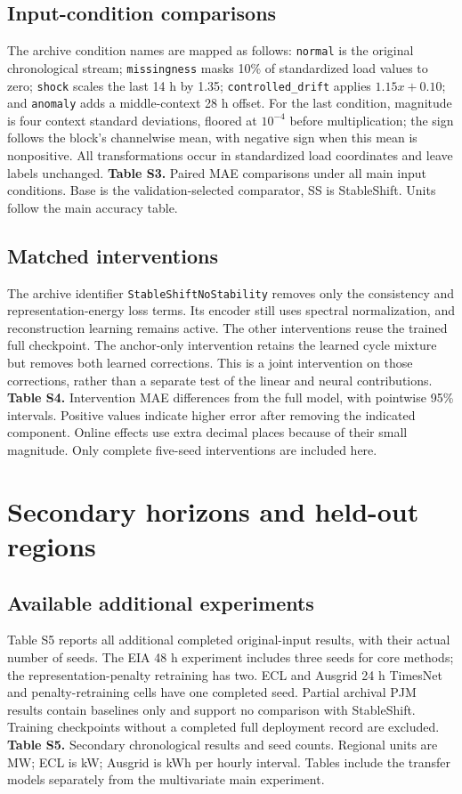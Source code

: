 \documentclass[11pt,a4paper]{article}
\begin{document}
\subsection{Input-condition comparisons}
The archive condition names are mapped as follows: \texttt{normal} is the original chronological stream; \texttt{missingness} masks 10\% of standardized load values to zero; \texttt{shock} scales the last 14 h by 1.35; \texttt{controlled\_drift} applies $1.15x+0.10$; and \texttt{anomaly} adds a middle-context 28 h offset. For the last condition, magnitude is four context standard deviations, floored at $10^{-4}$ before multiplication; the sign follows the block's channelwise mean, with negative sign when this mean is nonpositive. All transformations occur in standardized load coordinates and leave labels unchanged.
\noindent\textbf{Table S3.} Paired MAE comparisons under all main input conditions. Base is the validation-selected comparator, SS is StableShift. Units follow the main accuracy table.


\subsection{Matched interventions}
The archive identifier \texttt{StableShiftNoStability} removes only the consistency and representation-energy loss terms. Its encoder still uses spectral normalization, and reconstruction learning remains active. The other interventions reuse the trained full checkpoint. The anchor-only intervention retains the learned cycle mixture but removes both learned corrections. This is a joint intervention on those corrections, rather than a separate test of the linear and neural contributions.
\noindent\textbf{Table S4.} Intervention MAE differences from the full model, with pointwise 95\% intervals. Positive values indicate higher error after removing the indicated component. Online effects use extra decimal places because of their small magnitude. Only complete five-seed interventions are included here.


\section{Secondary horizons and held-out regions}
\subsection{Available additional experiments}
Table S5 reports all additional completed original-input results, with their actual number of seeds. The EIA 48 h experiment includes three seeds for core methods; the representation-penalty retraining has two. ECL and Ausgrid 24 h TimesNet and penalty-retraining cells have one completed seed. Partial archival PJM results contain baselines only and support no comparison with StableShift. Training checkpoints without a completed full deployment record are excluded.
\noindent\textbf{Table S5.} Secondary chronological results and seed counts. Regional units are MW; ECL is kW; Ausgrid is kWh per hourly interval. Tables include the transfer models separately from the multivariate main experiment.

\end{document}
